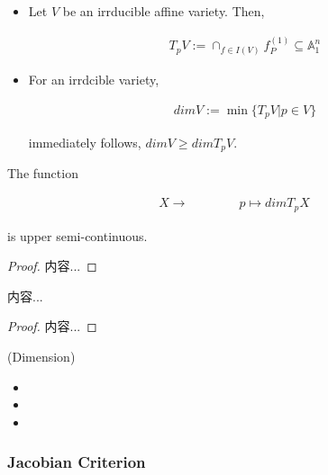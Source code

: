 \documentclass[Total.tex]{subfiles}
\begin{document}
					\begin{Def}
						\begin{itemize}
							\item Let $V$ be an irrducible affine variety. Then,
							
							\begin{gather*}
								T_p V:=\cap_{f\in I(V)} f^{(1)}_P \subseteq \mathbb{A}^n_1
							\end{gather*}
							
							\item For an irrdcible variety,
							
							\begin{gather*}
								dimV:=\min\{T_pV|p\in V\}
							\end{gather*}
							
							immediately follows, $dimV\geq dim T_p V$.
						\end{itemize}
					\end{Def}
					
					\begin{proposition}
						The function
						
						\begin{gather*}
							X\rightarrow\qquad \qquad p\mapsto dimT_p X
						\end{gather*}
						
						is upper semi-continuous.
					\end{proposition}
					
					\begin{proof}
						内容...
					\end{proof}
					
					\begin{proposition}
						内容...
					\end{proposition}
					
					\begin{proof}
						内容...
					\end{proof}
					
					\begin{Def}
						(Dimension) 
						
						\begin{itemize}
							\item 
							\item 
							\item 
						\end{itemize}
					\end{Def}
					
					\subsubsection{Jacobian Criterion}
					
\end{document}
